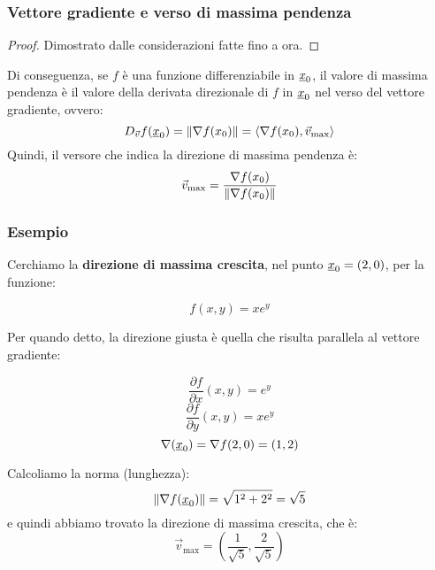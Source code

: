 \pagebreak
\subsubsection{Vettore gradiente e verso di massima pendenza}


\begin{proof}
    Dimostrato dalle considerazioni fatte fino a ora.
\end{proof}

Di conseguenza, se \(f\) è una funzione differenziabile in \(\underline{x}_0\), il valore di massima pendenza è il valore della derivata direzionale di \(f\) in \(\underline{x}_0\) nel verso del vettore gradiente, ovvero:
\[
    D_{\vec{v} } f(\underline{x}_0) = \left\lVert\nabla f(x_0)\right\rVert = \langle\nabla f(x_0),\vec{v}_{\max}\rangle
\]
Quindi, il versore che indica la direzione di massima pendenza è:
\[
    \vec{v}_{\max} = \frac{\nabla f(x_0)}{\left\lVert\nabla f(x_0)\right\rVert}
\]


\subsubsection*{Esempio}

Cerchiamo la \textbf{direzione di massima crescita}, nel punto \(\underline{x}_0=(2,0)\), per la funzione:

\[
    f(x,y) = xe^{y}
\]

Per quando detto, la direzione giusta è quella che risulta parallela al vettore gradiente:

\[
    \frac{\partial f}{\partial x}(x,y)  = e ^{y}
\]
\[
    \frac{\partial f}{\partial y}(x,y) = xe^{y}
\]
\[
    \nabla(\underline{x}_0) = \nabla f(2,0) = (1,2)
\]

Calcoliamo la norma (lunghezza):
\[
    \left\lVert\nabla f(\underline{x}_0)\right\rVert = \sqrt{1^{2}+2^{2}} = \sqrt{5}
\]
e quindi abbiamo trovato la direzione di massima crescita, che è:
\[
    \vec{v}_{\max} = \left( \frac{1}{\sqrt{5}}, \frac{2}{\sqrt{5}} \right)
\]

